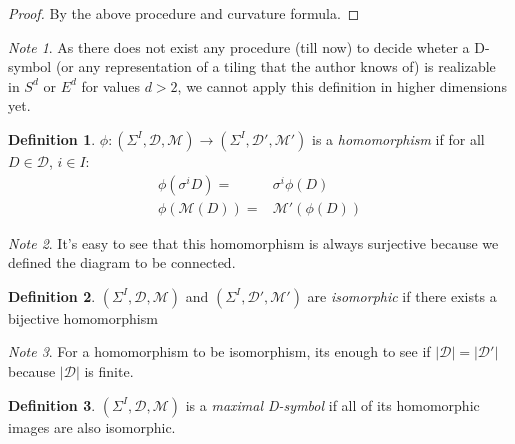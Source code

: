 \documentclass[12pt,a4paper]{article}
\numberwithin{equation}{section}
\theoremstyle{plain}%
\theoremstyle{definition}
\newtheorem{defn}{Definition}[section]
\theoremstyle{remark}
\newtheorem*{note}{Note}
\begin{document}
\begin{proof}
  By the above procedure and curvature formula.

%
\end{proof}

\begin{note}
  As there does not exist any procedure (till now) to decide wheter a D-symbol
  (or any representation of a tiling that the author knows of) is realizable in
  $S^d$ or $E^d$ for values $d>2$, we cannot apply this definition in higher
  dimensions yet.
\end{note}

\begin{defn}
  $\phi: (\Sigma^I,\mathcal{D},\mathcal{M}) \rightarrow
  (\Sigma^I,\mathcal{D}',\mathcal{M}')$ is a {\em homomorphism} if for all $D\in
  \mathcal{D}$, $i \in I$:
  \begin{align}
    \phi(\sigma^iD)= & \sigma^i\phi(D) \\
    \phi(\mathcal{M}(D))= & \mathcal{M}'(\phi(D))
  \end{align}
\end{defn}

\begin{note}
  It's easy to see that this homomorphism is always surjective because we
  defined the diagram to be connected.
\end{note}

\begin{defn}
  $(\Sigma^I,\mathcal{D},\mathcal{M})$ and
  $(\Sigma^I,\mathcal{D}',\mathcal{M}')$ are {\em isomorphic} if there exists a
  bijective homomorphism
\end{defn}

\begin{note}
  For a homomorphism to be isomorphism, its enough to see if
  $|\mathcal{D}|=|\mathcal{D}'|$ because $|\mathcal{D}|$ is finite.
\end{note}

\begin{defn}
  $(\Sigma^I,\mathcal{D},\mathcal{M})$ is a {\em maximal D-symbol} if all of its
  homomorphic images are also isomorphic.
\end{defn}
\end{document}
